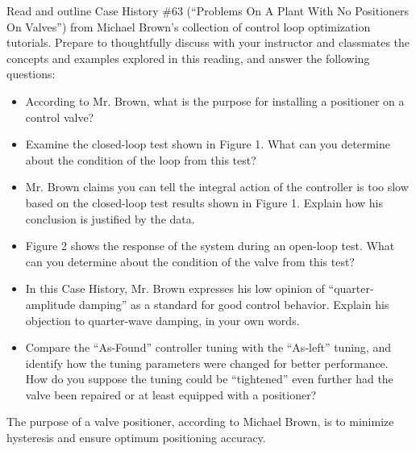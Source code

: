 

Read and outline Case History \#63 (``Problems On A Plant With No Positioners On Valves'') from Michael Brown's collection of control loop optimization tutorials.  Prepare to thoughtfully discuss with your instructor and classmates the concepts and examples explored in this reading, and answer the following questions:

\begin{itemize}
\item{} According to Mr. Brown, what is the purpose for installing a positioner on a control valve?
\vskip 10pt
\item{} Examine the closed-loop test shown in Figure 1.  What can you determine about the condition of the loop from this test?
\vskip 10pt
\item{} Mr. Brown claims you can tell the integral action of the controller is too slow based on the closed-loop test results shown in Figure 1.  Explain how his conclusion is justified by the data.
\vskip 10pt
\item{} Figure 2 shows the response of the system during an open-loop test.  What can you determine about the condition of the valve from this test?
\vskip 10pt
\item{} In this Case History, Mr. Brown expresses his low opinion of ``quarter-amplitude damping'' as a standard for good control behavior.  Explain his objection to quarter-wave damping, in your own words.
\vskip 10pt
\item{} Compare the ``As-Found'' controller tuning with the ``As-left'' tuning, and identify how the tuning parameters were changed for better performance.  How do you suppose the tuning could be ``tightened'' even further had the valve been repaired or at least equipped with a positioner?
\end{itemize}














The purpose of a valve positioner, according to Michael Brown, is to minimize hysteresis and ensure optimum positioning accuracy.

